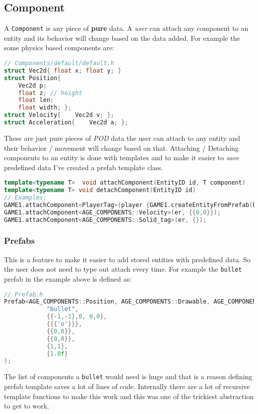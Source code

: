 \documentclass[16pt,a4paper]{article}
\begin{document}
\subsection{Component}
A \texttt{Component} is any piece of \textbf{pure} data. A \textit{user} can attach any component to an entity and its behavior will change based on the data added. For example the some physics based components are:

\begin{lstlisting}[language=c++]
// Components/default/default.h
struct Vec2d{ float x; float y; }
struct Position{
	Vec2d p;
	float z; // height
	float len;
	float width; };
struct Velocity{ 	Vec2d v; };
struct Acceleration{ 	Vec2d a; };
\end{lstlisting}
These are just pure pieces of \textit{POD} data the user can attach to any entity and their behavior / movement will change based on that. Attaching / Detaching components to an entity is done with templates and to make it easier to \textit{save} predefined data I've created a prefab template class. 
\begin{lstlisting}[language=c++]
template<typename T>  void attachComponent(EntityID id, T component)
template<typename T> void detachComponent(EntityID id)
// Examples: 
GAME1.attachComponent<PlayerTag>(player {GAME1.createEntityFromPrefab(bullet), 0});
GAME1.attachComponent<AGE_COMPONENTS::Velocity>(er, {{0,0}});
GAME1.attachComponent<AGE_COMPONENTS::Solid_tag>(er, {});
\end{lstlisting}
\subsubsection{Prefabs}
This is a feature to make it easier to add stored entities with predefined data. So the user does not need to type out attach every time. For example the \texttt{bullet} prefab in the example above is defined as:
\begin{lstlisting}[language=c++]
// Prefab.h
Prefab<AGE_COMPONENTS::Position, AGE_COMPONENTS::Drawable, AGE_COMPONENTS::Velocity, AGE_COMPONENTS::Acceleration, AGE_COMPONENTS::BoxCollider, AGE_COMPONENTS::Mass> bullet(
            "bullet",
            {{-1,-1},0, 0,0},
            {{{'o'}}},
            {{0,0}},
            {{0,0}},
            {1,1},
            {1.0f}
);
\end{lstlisting}
The list of components a \texttt{bullet} would need is huge and that is a reason defining prefab template saves a lot of lines of code. Internally there are a lot of recursive template functions to make this work and this was one of the trickiest abstraction to get to work. 
\end{document}
